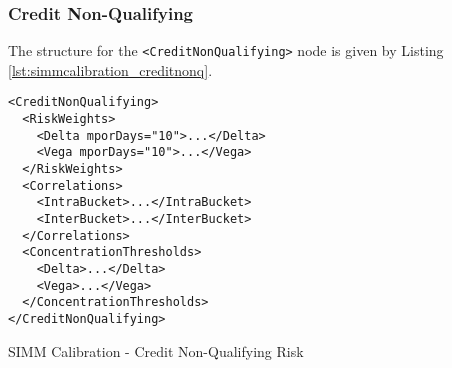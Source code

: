 \subsubsection{Credit Non-Qualifying}
The structure for the {\tt <CreditNonQualifying>} node is given by Listing \ref{lst:simmcalibration_creditnonq}.

\begin{listing}[H]
\begin{verbatim}
<CreditNonQualifying>
  <RiskWeights>
    <Delta mporDays="10">...</Delta>
    <Vega mporDays="10">...</Vega>
  </RiskWeights>
  <Correlations>
    <IntraBucket>...</IntraBucket>
    <InterBucket>...</InterBucket>
  </Correlations>
  <ConcentrationThresholds>
    <Delta>...</Delta>
    <Vega>...</Vega>
  </ConcentrationThresholds>
</CreditNonQualifying>
\end{verbatim}
\caption{SIMM Calibration - Credit Non-Qualifying Risk}
\label{lst:simmcalibration_creditnonq}
\end{listing}

